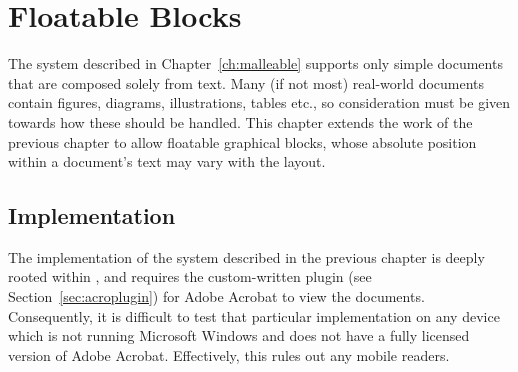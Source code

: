 \cleardoublepage
\chapter{Floatable Blocks}\label{ch:floats}

% 

The system described in Chapter~\ref{ch:malleable} supports only simple documents that are composed solely from text. Many (if not most) real-world documents contain figures, diagrams, illustrations, tables etc., so consideration must be given towards how these should be handled.
This chapter extends the work of the previous chapter to allow floatable graphical blocks, whose absolute position within a document's text may vary with the layout.

\section{Implementation}

The implementation of the system described in the previous chapter is deeply rooted within \pdf{}, and requires the custom-written plugin (see Section~\ref{sec:acroplugin}) for Adobe Acrobat to view the documents. Consequently, it is difficult to test that particular implementation on any device which is not running Microsoft Windows and does not have a fully licensed version of Adobe Acrobat. Effectively, this rules out any mobile \ebook{} readers.


